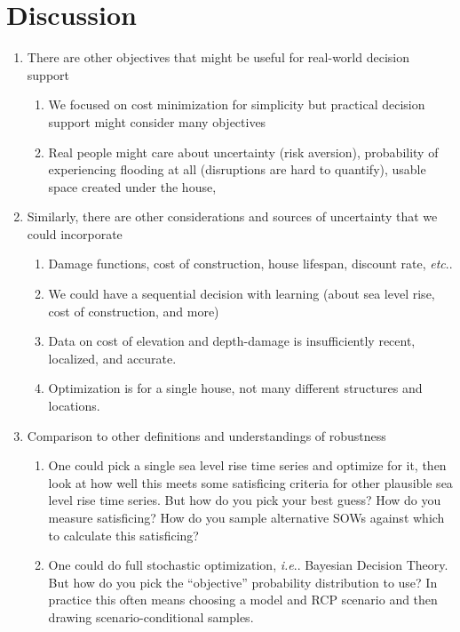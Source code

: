 \documentclass[12pt]{article}
\makeatletter
\DeclareRobustCommand\onedot{\futurelet\@let@token\@onedot}
\def\@onedot{\ifx\@let@token.\else.\null\fi\xspace}
\def\ie{\emph{i.e}\onedot} \def\Ie{\emph{I.e}\onedot}
\def\etc{\emph{etc}\onedot} \def\vs{\emph{vs}\onedot}
\makeatother
\begin{document}
\section{Discussion}

\begin{enumerate}
    \item There are other objectives that might be useful for real-world decision support
          \begin{enumerate}
              \item We focused on cost minimization for simplicity but practical decision support might consider many objectives
              \item Real people might care about uncertainty (risk aversion), probability of experiencing flooding at all (disruptions are hard to quantify), usable space created under the house,
          \end{enumerate}
    \item Similarly, there are other considerations and sources of uncertainty that we could incorporate
          \begin{enumerate}
              \item Damage functions, cost of construction, house lifespan, discount rate, \etc
              \item We could have a sequential decision with learning (about sea level rise, cost of construction, and more)
              \item Data on cost of elevation and depth-damage is insufficiently recent, localized, and accurate.
              \item Optimization is for a single house, not many different structures and locations.
          \end{enumerate}
    \item Comparison to other definitions and understandings of robustness
          \begin{enumerate}
              \item One could pick a single sea level rise time series and optimize for it, then look at how well this meets some satisficing criteria for other plausible sea level rise time series. But how do you pick your best guess? How do you measure satisficing? How do you sample alternative SOWs against which to calculate this satisficing?
              \item One could do full stochastic optimization, \ie Bayesian Decision Theory. But how do you pick the ``objective'' probability distribution to use? In practice this often means choosing a model and RCP scenario and then drawing scenario-conditional samples.

\end{enumerate}
\end{enumerate}
\end{document}
